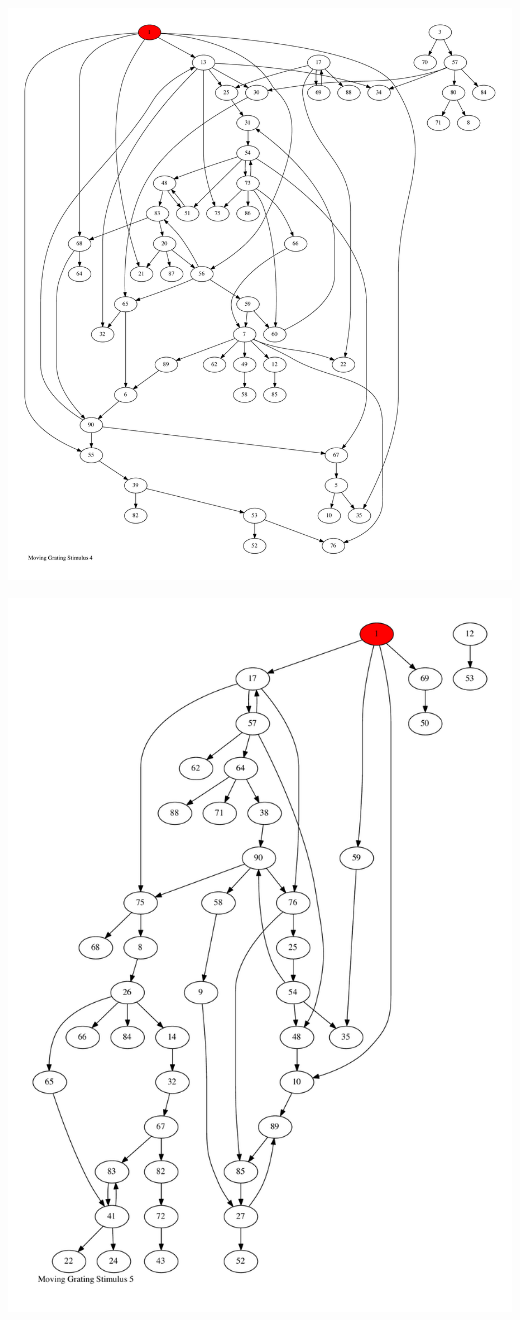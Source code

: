 \documentclass{article}
\begin{document}
\newpage
\includegraphics[max height=\textheight,max width=\textwidth]{stim_mov_grat/stim4_pp.pdf}

\newpage
\includegraphics[max height=\textheight,max width=\textwidth]{stim_mov_grat/stim5_pp.pdf}
\end{document}
